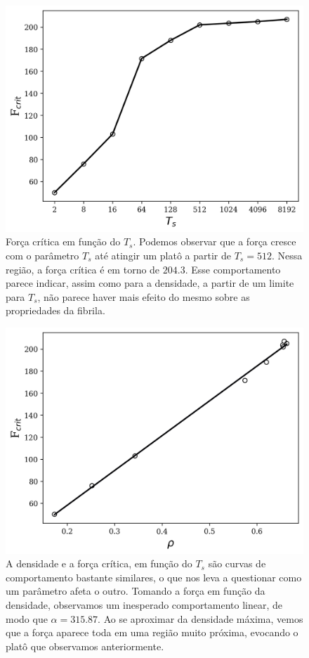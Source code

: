 \documentclass{article}
\begin{document}
\begin{figure}[H]
    \centering
    \includegraphics[width=\textwidth]{figures/force_ts.png}

    \caption{Força crítica em função do $T_{s}$. Podemos observar que a força cresce com o parâmetro $T_{s}$ até atingir um platô a partir de $T_{s} = 512$. Nessa região, a força crítica é em torno de $204.3$. Esse comportamento parece indicar, assim como para a densidade, a partir de um limite para $T_{s}$, não parece haver mais efeito do mesmo sobre as propriedades da fibrila.} 

    \label{}
\end{figure}

\begin{figure}[H]
    \centering
    \includegraphics[width=\textwidth]{figures/force_dens.png}

    \caption{A densidade e a força crítica, em função do $T_{s}$ são curvas de comportamento bastante similares, o que nos leva a questionar como um parâmetro afeta o outro. Tomando a força em função da densidade, observamos um inesperado comportamento linear, de modo que $\alpha = 315.87$. Ao se aproximar da densidade máxima, vemos que a força aparece toda em uma região muito próxima, evocando o platô que observamos anteriormente.} 

    \label{}
\end{figure}
\end{document}
